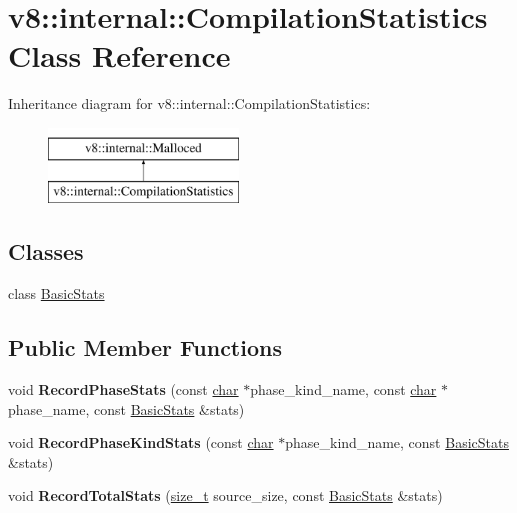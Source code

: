 \hypertarget{classv8_1_1internal_1_1CompilationStatistics}{}\section{v8\+:\+:internal\+:\+:Compilation\+Statistics Class Reference}
\label{classv8_1_1internal_1_1CompilationStatistics}
Inheritance diagram for v8\+:\+:internal\+:\+:Compilation\+Statistics\+:\begin{figure}[H]
\begin{center}
\leavevmode
\includegraphics[height=2.000000cm]{classv8_1_1internal_1_1CompilationStatistics}
\end{center}
\end{figure}
\subsection*{Classes}
\begin{DoxyCompactItemize}
\item 
class \mbox{\hyperlink{classv8_1_1internal_1_1CompilationStatistics_1_1BasicStats}{Basic\+Stats}}
\end{DoxyCompactItemize}
\subsection*{Public Member Functions}
\begin{DoxyCompactItemize}
\item 
\mbox{\label{classv8_1_1internal_1_1CompilationStatistics_a0248f4a218dc1fd98f0065c925c582e2}} 
void {\bfseries Record\+Phase\+Stats} (const \mbox{\hyperlink{classchar}{char}} $\ast$phase\+\_\+kind\+\_\+name, const \mbox{\hyperlink{classchar}{char}} $\ast$phase\+\_\+name, const \mbox{\hyperlink{classv8_1_1internal_1_1CompilationStatistics_1_1BasicStats}{Basic\+Stats}} \&stats)
\item 
\mbox{\label{classv8_1_1internal_1_1CompilationStatistics_a8004a24dfaa736b2fa06521d85a6fc7d}} 
void {\bfseries Record\+Phase\+Kind\+Stats} (const \mbox{\hyperlink{classchar}{char}} $\ast$phase\+\_\+kind\+\_\+name, const \mbox{\hyperlink{classv8_1_1internal_1_1CompilationStatistics_1_1BasicStats}{Basic\+Stats}} \&stats)
\item 
\mbox{\label{classv8_1_1internal_1_1CompilationStatistics_a0c3a792d35bd4e9c6c49409e0fb5c9ee}} 
void {\bfseries Record\+Total\+Stats} (\mbox{\hyperlink{classsize__t}{size\+\_\+t}} source\+\_\+size, const \mbox{\hyperlink{classv8_1_1internal_1_1CompilationStatistics_1_1BasicStats}{Basic\+Stats}} \&stats)
\end{DoxyCompactItemize}
